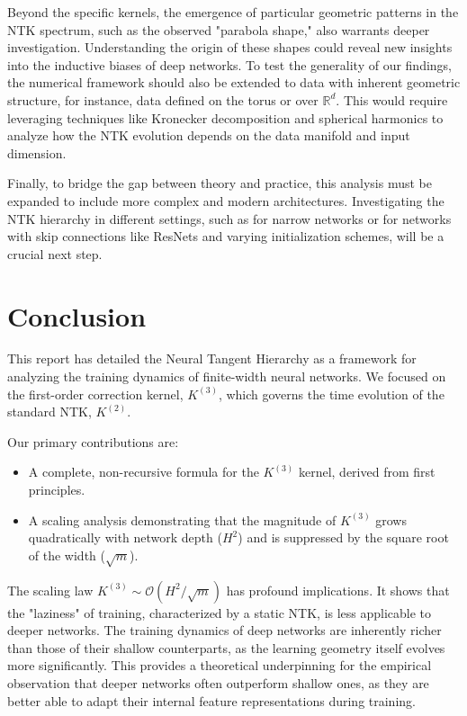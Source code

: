 \documentclass{article}
\newcommand{\Order}{\mathcal{O}}
\begin{document}
Beyond the specific kernels, the emergence of particular geometric patterns in the NTK spectrum, such as the observed "parabola shape," also warrants deeper investigation. Understanding the origin of these shapes could reveal new insights into the inductive biases of deep networks. To test the generality of our findings, the numerical framework should also be extended to data with inherent geometric structure, for instance, data defined on the torus or over $\mathbb{R}^d$. This would require leveraging techniques like Kronecker decomposition and spherical harmonics to analyze how the NTK evolution depends on the data manifold and input dimension.

Finally, to bridge the gap between theory and practice, this analysis must be expanded to include more complex and modern architectures. Investigating the NTK hierarchy in different settings, such as for narrow networks or for networks with skip connections like ResNets and varying initialization schemes, will be a crucial next step.

\section{Conclusion}

This report has detailed the Neural Tangent Hierarchy as a framework for analyzing the training dynamics of finite-width neural networks. We focused on the first-order correction kernel, $K^{(3)}$, which governs the time evolution of the standard NTK, $K^{(2)}$.

Our primary contributions are:
\begin{itemize}
    \item A complete, non-recursive formula for the $K^{(3)}$ kernel, derived from first principles.
    \item A scaling analysis demonstrating that the magnitude of $K^{(3)}$ grows quadratically with network depth ($H^2$) and is suppressed by the square root of the width ($\sqrt{m}$).
\end{itemize}

The scaling law $K^{(3)} \sim \Order(H^2/\sqrt{m})$ has profound implications. It shows that the "laziness" of training, characterized by a static NTK, is less applicable to deeper networks. The training dynamics of deep networks are inherently richer than those of their shallow counterparts, as the learning geometry itself evolves more significantly. This provides a theoretical underpinning for the empirical observation that deeper networks often outperform shallow ones, as they are better able to adapt their internal feature representations during training.
\end{document}
